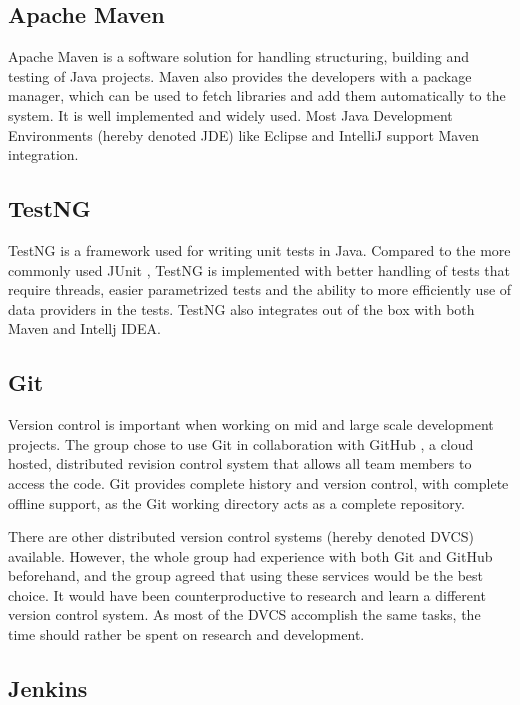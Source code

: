 \subsection{Apache Maven}
\label{subsec:prestudies-tools-apache_maven}

Apache Maven is a software solution for handling structuring, building and testing of Java projects. Maven also provides the developers with a package manager, which can be used to fetch libraries and add them automatically to the system. It is well implemented and widely used. Most Java Development Environments (hereby denoted JDE) like Eclipse and IntelliJ support Maven integration.

\subsection{TestNG}
\label{subsec:prestudies-tools-testng}

TestNG \cite{test-ng} is a framework used for writing unit tests in Java. Compared to the more commonly used JUnit \cite{junit}, TestNG is implemented with better handling of tests that require threads, easier parametrized tests and the ability to more efficiently use of data providers in the tests. TestNG also integrates out of the box with both Maven and Intellj IDEA.

\subsection{Git}
\label{subsec:prestudies-tools-git}

Version control is important when working on mid and large scale development projects. The group chose to use Git \cite{git} in collaboration with GitHub \cite{github}, a cloud hosted, distributed revision control system that allows all team members to access the code. Git provides complete history and version control, with complete offline support, as the Git working directory acts as a complete repository.

There are other distributed version control systems (hereby denoted DVCS) available. However, the whole group had experience with both Git and GitHub beforehand, and the group agreed that using these services would be the best choice. It would have been counterproductive to research and learn a different version control system. As most of the DVCS accomplish the same tasks, the time should rather be spent on research and development.

\subsection{Jenkins}
\label{subsec:prestudies-tools-jenkins}

